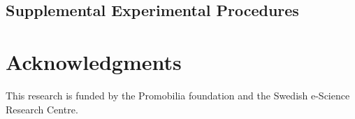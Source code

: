 




\begin{appendices}
	\renewcommand{\thesection}{\Roman{section}}
	
	
	
	\section*{Supplemental Experimental Procedures}
	
	
	
	
	
	
	
\end{appendices}
%

\section*{Acknowledgments}
This research is funded by the Promobilia foundation and the Swedish
e-Science Research Centre.

{\small
}